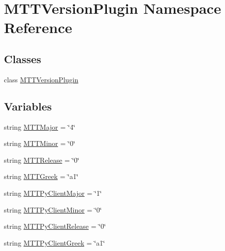 \hypertarget{namespace_m_t_t_version_plugin}{\section{M\-T\-T\-Version\-Plugin Namespace Reference}
\label{namespace_m_t_t_version_plugin}
}
\subsection*{Classes}
\begin{DoxyCompactItemize}
\item 
class \hyperlink{class_m_t_t_version_plugin_1_1_m_t_t_version_plugin}{M\-T\-T\-Version\-Plugin}
\end{DoxyCompactItemize}
\subsection*{Variables}
\begin{DoxyCompactItemize}
\item 
string \hyperlink{namespace_m_t_t_version_plugin_af9e75ea5f854bed820d4cb64fa455124}{M\-T\-T\-Major} = \char`\"{}4\char`\"{}
\item 
string \hyperlink{namespace_m_t_t_version_plugin_ad80f82936d1bc7547278d4ce2ea3a275}{M\-T\-T\-Minor} = \char`\"{}0\char`\"{}
\item 
string \hyperlink{namespace_m_t_t_version_plugin_a9d8e0707641b9a16174563aacdc82407}{M\-T\-T\-Release} = \char`\"{}0\char`\"{}
\item 
string \hyperlink{namespace_m_t_t_version_plugin_ac27a9d2aec2e835e6f4dc27c68382f38}{M\-T\-T\-Greek} = \char`\"{}a1\char`\"{}
\item 
string \hyperlink{namespace_m_t_t_version_plugin_a51adbd87756e59f2189831112aad767e}{M\-T\-T\-Py\-Client\-Major} = \char`\"{}1\char`\"{}
\item 
string \hyperlink{namespace_m_t_t_version_plugin_aa431ead037b1e7329d119bc1e4017ced}{M\-T\-T\-Py\-Client\-Minor} = \char`\"{}0\char`\"{}
\item 
string \hyperlink{namespace_m_t_t_version_plugin_ae6cedc84f8ae714487299ccdc4403a10}{M\-T\-T\-Py\-Client\-Release} = \char`\"{}0\char`\"{}
\item 
string \hyperlink{namespace_m_t_t_version_plugin_a6df21a21318661784dcabdb81450ff48}{M\-T\-T\-Py\-Client\-Greek} = \char`\"{}a1\char`\"{}
\end{DoxyCompactItemize}


